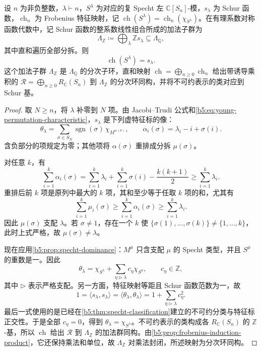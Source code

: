 \begin{theorem}\label{b5:thm:frobenius-characteristic}
	设 \(n\) 为非负整数，\(\lambda\vdash n\)，\(S^\lambda\) 为对应的复 Specht 左 \(\mathbb C[S_n]\)-模，\(s_\lambda\) 为 Schur 函数，\(\operatorname{ch}_n\) 为 Frobenius 特征映射，记 \(\operatorname{ch}(S^\lambda)=\operatorname{ch}_n(\chi_{S^\lambda})\)。在有理系数对称函数代数中，记 Schur 函数的整系数线性组合所成的加法子群为
	\[
		\Lambda_{\mathbb Z}\coloneqq\bigoplus_\lambda\mathbb Zs_\lambda \subseteq\Lambda_{\mathbb Q},
	\]
	其中直和遍历全部分拆。则
	\begin{equation}\label{b5:eq:specht-schur}
		\operatorname{ch}(S^\lambda)=s_\lambda.
	\end{equation}
	这个加法子群 \(\Lambda_{\mathbb Z}\) 是 \(\Lambda_{\mathbb Q}\) 的分次子环，直和映射 \(\operatorname{ch}=\bigoplus_{n\ge0}\operatorname{ch}_n\) 给出带诱导乘积的 \(\mathcal R=\bigoplus_{n\ge0}R_{\mathbb C}(S_n)\) 到 \(\Lambda_{\mathbb Z}\) 的分次环同构，并将不可约表示的类对应到 Schur 基。
\end{theorem}
\begin{proof}
	取 \(N\ge n\)，将 \(\lambda\) 补零到 \(N\) 项。由 Jacobi--Trudi 公式和\eqref{b5:eq:young-permutation-characteristic}，\(s_\lambda\) 是下列虚特征标的像：
	\[
		\theta_\lambda =\sum_{\sigma\in S_N}\operatorname{sgn}(\sigma)\, \chi_{M^{\alpha(\sigma)}}, \qquad \alpha_i(\sigma)=\lambda_i-i+\sigma(i).
	\]
	含负部分的项规定为零；其他项将 \(\alpha(\sigma)\) 重排成分拆 \(\mu(\sigma)\)。

	对任意 \(k\)，有
	\[
		\sum_{i=1}^k\alpha_i(\sigma) =\sum_{i=1}^k\lambda_i+ \sum_{i=1}^k\sigma(i)-\frac{k(k+1)}2 \ge\sum_{i=1}^k\lambda_i.
	\]
	重排后前 \(k\) 项是原列中最大的 \(k\) 项，其和至少等于任取 \(k\) 项的和，尤其有
	\[
		\sum_{i=1}^k\mu_i(\sigma) \ge\sum_{i=1}^k\alpha_i(\sigma) \ge\sum_{i=1}^k\lambda_i.
	\]
	因此 \(\mu(\sigma)\) 支配 \(\lambda\)。若 \(\sigma\ne1\)，存在一个 \(k\) 使 \(\bigl\{\sigma(1),\ldots,\sigma(k)\bigr\}\ne\{1,\ldots,k\}\)，此时上式严格，故 \(\mu(\sigma)\ne\lambda\)。

	现在应用\cref{b5:prop:specht-dominance}：\(M^\mu\) 只含支配 \(\mu\) 的 Specht 类型，并且 \(S^\mu\) 的重数是一。因此
	\[
		\theta_\lambda=\chi_{S^\lambda} +\sum_{\eta\triangleright\lambda}c_\eta\chi_{S^\eta}, \qquad c_\eta\in\mathbb Z,
	\]
	其中 \(\triangleright\) 表示严格支配。另一方面，特征映射等距且 Schur 函数范数为一，故
	\[
		1=\langle s_\lambda,s_\lambda\rangle =\langle\theta_\lambda,\theta_\lambda\rangle =1+\sum_{\eta\triangleright\lambda}c_\eta^2.
	\]
	最后一式使用的是已经在\cref{b5:thm:specht-classification}建立的不可约分类与特征标正交性。于是全部 \(c_\eta=0\)，得到 \(\theta_\lambda=\chi_{S^\lambda}\)。不可约表示的类构成各 \(R_{\mathbb C}(S_n)\) 的 \(\mathbb Z\)-基，所以 \(\operatorname{ch}\) 给出 \(\mathcal R\) 到 \(\Lambda_{\mathbb Z}\) 的加法群同构。由\cref{b5:prop:frobenius-induction-product}，它还保持乘法和单位，故 \(\Lambda_{\mathbb Z}\) 对乘法封闭，所述映射为分次环同构。
\end{proof}

